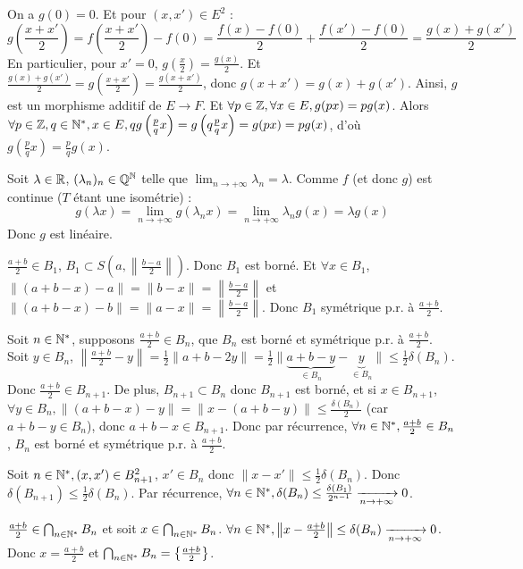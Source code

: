\begin{solution}
On a $g(0) = 0$.
Et pour $(x, x') \in E^2$ :
\[ g\left(\frac{x + x'}{2}\right) = f\left(\frac{x + x'}{2}\right) - f(0) = \frac{f(x) - f(0)}{2} + \frac{f(x') - f(0)}{2} = \frac{g(x) + g(x')}{2} \]
En particulier, pour $x' = 0$, $g\left(\frac{x}{2}\right) = \frac{g(x)}{2}$.
Et $\frac{g(x) + g(x')}{2} = g\left(\frac{x + x'}{2}\right) = \frac{g(x + x')}{2}$, donc $g(x + x') = g(x) + g(x')$.
Ainsi, $g$ est un morphisme additif de $E \to F$.
Et $\forall p \in \mathbb Z, \forall x \in E, g(px) = p g(x)$.
Alors $\forall p \in \mathbb Z, q \in \mathbb N^*, x \in E, q g\left(\frac{p}{q} x\right) = g\left(q \frac{p}{q} x\right) = g(px) = p g(x)$, d'où $g\left(\frac{p}{q} x\right) = \frac{p}{q} g(x)$.

Soit $\lambda \in \mathbb R$, $(\lambda_n)_n \in \mathbb{Q}^\mathbb N$ telle que $\lim_{n \to +\infty} \lambda_n = \lambda$.
Comme $f$ (et donc $g$) est continue ($T$ étant une isométrie) :
\[ g(\lambda x) = \lim_{n \to +\infty} g(\lambda_n x) = \lim_{n \to +\infty} \lambda_n g(x) = \lambda g(x) \]
Donc $g$ est linéaire.

$\frac{a + b}{2} \in B_1$, $B_1 \subset S\left(a, \left\|\frac{b - a}{2}\right\|\right)$. Donc $B_1$ est borné.
Et $\forall x \in B_1$, $\|(a + b - x) - a\| = \|b - x\| = \left\|\frac{b - a}{2}\right\|$ et $\|(a + b - x) - b\| = \|a - x\| = \left\|\frac{b - a}{2}\right\|$.
Donc $B_1$ symétrique p.r. à $\frac{a + b}{2}$.

Soit $n \in \mathbb N^*$, supposons $\frac{a + b}{2} \in B_n$, que $B_n$ est borné et symétrique p.r. à $\frac{a + b}{2}$.
Soit $y \in B_n$, $\left\|\frac{a + b}{2} - y\right\| = \frac{1}{2} \|a + b - 2y\| = \frac{1}{2} \|\underbrace{a + b - y}_{\in B_n} - \underbrace{y}_{\in B_n}\| \leq \frac{1}{2} \delta(B_n)$.
Donc $\frac{a + b}{2} \in B_{n+1}$.
De plus, $B_{n+1} \subset B_n$ donc $B_{n+1}$ est borné, et si $x \in B_{n+1}$, $\forall y \in B_n, \|(a + b - x) - y\| = \|x - (a + b - y)\| \leq \frac{\delta(B_n)}{2}$ (car $a + b - y \in B_n$), donc $a + b - x \in B_{n+1}$.
Donc par récurrence, $\forall n \in \mathbb N^*, \frac{a + b}{2} \in B_n$, $B_n$ est borné et symétrique p.r. à $\frac{a + b}{2}$.

Soit $n \in \mathbb N^*, (x, x') \in B_{n+1}^2$, $x' \in B_n$ donc $\|x - x'\| \leq \frac{1}{2} \delta(B_n)$.
Donc $\delta(B_{n+1}) \leq \frac{1}{2} \delta(B_n)$.
Par récurrence, $\forall n \in \mathbb N^*, \delta(B_n) \leq \frac{\delta(B_1)}{2^{n-1}} \xrightarrow[n \to +\infty]{} 0$.

$\frac{a + b}{2} \in \bigcap_{n \in \mathbb N^*} B_n$ et soit $x \in \bigcap_{n \in \mathbb N^*} B_n$.
$\forall n \in \mathbb N^*, \left\|x - \frac{a + b}{2}\right\| \leq \delta(B_n) \xrightarrow[n \to +\infty]{} 0$.
Donc $x = \frac{a + b}{2}$ et $\bigcap_{n \in \mathbb N^*} B_n = \left\{\frac{a + b}{2}\right\}$.


\end{solution}
